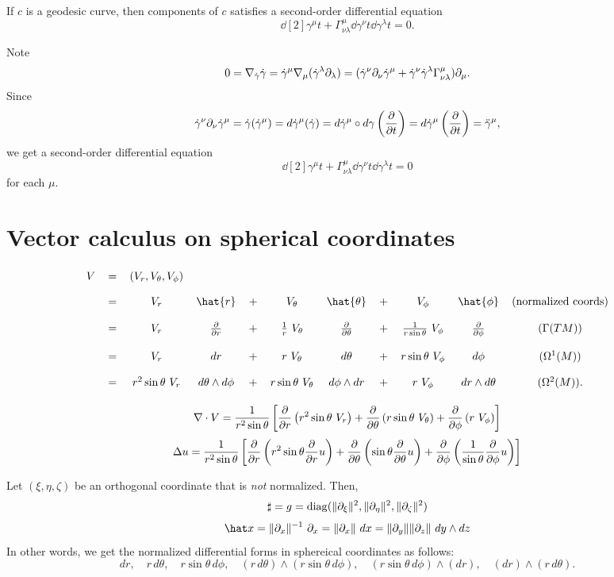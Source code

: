 \documentclass[a4paper]{article}
\begin{document}
\begin{thm}
If $c$ is a geodesic curve, then components of $c$ satisfies a second-order differential equation
\[\dd[2]{\gamma^\mu}{t}+\Gamma_{\nu\lambda}^\mu\dd{\gamma^\nu}{t}\dd{\gamma^\lambda}{t}=0.\]
\end{thm}
\begin{pf}
Note
\[0=\nabla_{\dot\gamma}\dot\gamma=\dot\gamma^\mu\nabla_\mu(\dot\gamma^\lambda\pd_\lambda)
=(\dot\gamma^\nu\pd_\nu\dot\gamma^\mu+\dot\gamma^\nu\dot\gamma^\lambda\Gamma_{\nu\lambda}^\mu)\pd_\mu.\]
Since
\[\dot\gamma^\nu\pd_\nu\dot\gamma^\mu=\dot\gamma(\dot\gamma^\mu)=d\dot\gamma^\mu(\dot\gamma)=d\dot\gamma^\mu\circ d\gamma\left(\pd{t}\right)=d\dot\gamma^\mu\left(\pd{t}\right)=\ddot\gamma^\mu,\]
we get a second-order differential equation
\[\dd[2]{\gamma^\mu}{t}+\Gamma_{\nu\lambda}^\mu\dd{\gamma^\nu}{t}\dd{\gamma^\lambda}{t}=0\]
for each $\mu$.
\end{pf}


\section{Vector calculus on spherical coordinates}
\[
\begin{tikzcd}[row sep=5pt, column sep=3pt]
V&=&(V_r,V_\theta,V_\phi)&&&&&&&&\\
&=&V_r&\hat{r}&+&V_\theta&\hat{\theta}&+&V_\phi&\hat{\phi}&(\text{normalized coords})\\
&=&V_r&\pd{r}&+&\frac1r\ V_\theta&\pd{\theta}&+&\frac1{r\sin\theta}\ V_\phi&\pd{\phi}&(\Gamma(TM))\\
&=&V_r&dr&+&r\ V_\theta&d\theta&+&r\sin\theta\ V_\phi&d\phi&(\Omega^1(M))\\
&=&r^2\sin\theta\ V_r&d\theta\wedge d\phi&+&r\sin\theta\ V_\theta&d\phi\wedge dr&+&r\ V_\phi&dr\wedge d\theta&(\Omega^2(M)).
\end{tikzcd}
\]

\[
\nabla\cdot V=\frac1{r^2\sin\theta}\left[  \pd{r}\left(r^2\sin\theta\ V_r\right) + \pd{\theta}\left(r\sin\theta\ V_\theta\right) + \pd{\phi}\left(r\ V_\phi\right)  \right]
\]
\[\Delta u=\frac1{r^2\sin\theta}\left[\pd{r}\left(r^2\sin\theta\pd{r}u\right)+\pd{\theta}\left(\sin\theta\pd{\theta}u\right)+\pd{\phi}\left(\frac1{\sin\theta}\pd{\phi}u\right)\right]\]

Let $(\xi,\eta,\zeta)$ be an orthogonal coordinate that is \emph{not} normalized.
Then,
\[\sharp=g=\diag(\|\pd_\xi\|^2,\|\pd_\eta\|^2,\|\pd_\zeta\|^2)\]
\[\hat x=\|\pd_x\|^{-1}\ \pd_x=\|\pd_x\|\ dx=\|\pd_y\|\|\pd_z\|\ dy\wedge dz\]
In other words, we get the normalized differential forms in sphereical coordinates as follows:
\[dr,\quad r\,d\theta,\quad r\sin\theta\,d\phi,\quad(r\,d\theta)\wedge(r\sin\theta\,d\phi),\quad(r\sin\theta\,d\phi)\wedge(dr),\quad(dr)\wedge(r\,d\theta).\]
\end{document}
